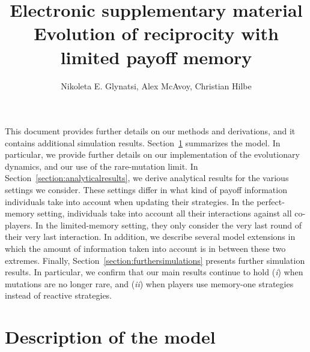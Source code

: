 \documentclass[11pt]{article}
\title{{ \sffamily \LARGE Electronic supplementary material}\\{\bf \sffamily \LARGE Evolution of reciprocity with limited payoff memory}}
\date{}
\author{Nikoleta E. Glynatsi, Alex McAvoy, Christian Hilbe}
\theoremstyle{plainCl1}
\theoremstyle{plainCl2}
\begin{document}
\maketitle



\noindent
This document provides further details on our methods and derivations, and it contains additional simulation results. 
Section~\ref{section:model} summarizes the model. 
In particular, we provide further details on our implementation of the evolutionary dynamics, and our use of the rare-mutation limit. 
In Section~\ref{section:analyticalresults}, we derive analytical results for the various settings we consider.
These settings differ in what kind of payoff information individuals take into account when updating their strategies. 
In the perfect-memory setting, individuals take into account all their interactions against all co-players.
In the limited-memory setting, they only consider the very last round of their very last interaction.  
In addition, we describe several model extensions in which the amount of information taken into account is in between these two extremes. 
Finally, Section~\ref{section:furthersimulations} presents further simulation results. 
In particular, we confirm that our main results continue to hold ({\it i}) when mutations are no longer rare, and  ({\it ii}) when players use memory-one strategies instead of reactive strategies.




\section{Description of the model}\label{section:model}

\end{document}
